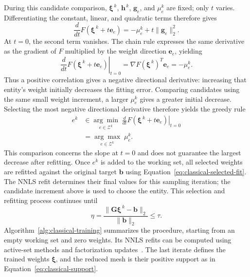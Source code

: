 \documentclass[a4paper,12pt]{article}
\newcommand{\vect}[1]{\boldsymbol{#1}}
\newcommand{\matr}[1]{\boldsymbol{#1}}
\begin{document}
During this candidate comparison, $\vect{\xi}^{\,k}$, $\vect{h}^{\,k}$, $\vect{g}_e$, and $\mu_e^k$ are fixed; only $t$ varies. Differentiating the constant, linear, and quadratic terms therefore gives
\[
 \frac{d}{dt}F(\vect{\xi}^{\,k}+t\vect{e}_e)
 =-\mu_e^k+t\|\vect{g}_e\|_2^2.
\]
At $t=0$, the second term vanishes. The chain rule expresses the same derivative as the gradient of $F$ multiplied by the weight direction $\vect{e}_e$, yielding
\begin{equation}
 \left.\frac{d}{dt}F(\vect{\xi}^{\,k}+t\vect{e}_e)\right|_{t=0}
 =\nabla F(\vect{\xi}^{\,k})^T\vect{e}_e
 =-\mu_e^k.
 \label{eq:classical-score-derivative}
\end{equation}
Thus a positive correlation gives a negative directional derivative: increasing that entity's weight initially decreases the fitting error. Comparing candidates using the same small weight increment, a larger $\mu_e^k$ gives a greater initial decrease. Selecting the most negative directional derivative therefore yields the greedy rule
\begin{equation}
 \begin{aligned}
 e^k&\in\underset{e\in\mathcal Z^k}{\arg\min}\;
       \left.\frac{d}{dt}F(\vect{\xi}^{\,k}+t\vect{e}_e)\right|_{t=0}\\
    &=\underset{e\in\mathcal Z^k}{\arg\max}\;\mu_e^k.
 \end{aligned}
 \label{eq:classical-selection}
\end{equation}
This comparison concerns the slope at $t=0$ and does not guarantee the largest decrease after refitting. Once $e^k$ is added to the working set, all selected weights are refitted against the original target $\vect{b}$ using Equation~\eqref{eq:classical-selected-fit}. The NNLS refit determines their final values for this sampling iteration; the candidate increment above is used to choose the entity. This selection and refitting process continues until
\begin{equation}
 \eta=\frac{\|\matr{G}\vect{\xi}^{\,k}-\vect{b}\|_2}{\|\vect{b}\|_2}
 \leq\tau.
 \label{eq:classical-training-tolerance}
\end{equation}
Algorithm~\ref{alg:classical-training} summarizes the procedure, starting from an empty working set and zero weights. Its NNLS refits can be computed using active-set methods and factorization updates~\cite[Sections~4--5]{chapman2017accelerated}. The last iterate defines the trained weights $\vect{\xi}$, and the reduced mesh is their positive support as in Equation~\eqref{eq:classical-support}.
\end{document}
